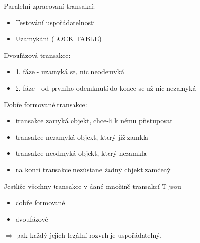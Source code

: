 \documentclass{szzclass}
\begin{document}
Paralelní zpracovaní transakcí:
\begin{itemize}
\item Testování uspořádatelnosti
\item Uzamykáni (LOCK TABLE)
\end{itemize}

Dvoufázová transakce:
\begin{itemize}
\item 1. fáze - uzamyká se, nic neodemyká
\item 2. fáze - od prvního odemknutí do konce se už nic nezamyká
\end{itemize}

Dobře formované transakce:
\begin{itemize}
\item transakce zamyká objekt, chce-li k němu přistupovat
\item transakce nezamyká objekt, který již zamkla
\item transakce neodmyká objekt, který nezamkla
\item na konci transakce nezůstane žádný objekt zamčený
\end{itemize}

Jestliže všechny transakce v dané množině transakcí T jsou:

\begin{itemize}
\item dobře formované
\item dvoufázové
\end{itemize}

$\Rightarrow$ pak každý jejich legální rozvrh je uspořádatelný.
\end{document}
